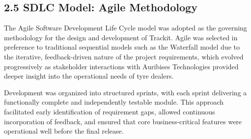 \documentclass[12pt, oneside]{article}
\begin{document}
\subsection*{2.5 SDLC Model: Agile Methodology}

The Agile Software Development Life Cycle model was adopted as the governing methodology for the design and development of Trackit. Agile was selected in preference to traditional sequential models such as the Waterfall model due to the iterative, feedback-driven nature of the project requirements, which evolved progressively as stakeholder interactions with Auribises Technologies provided deeper insight into the operational needs of tyre dealers.

\vspace{0.5em}
Development was organized into structured sprints, with each sprint delivering a functionally complete and independently testable module. This approach facilitated early identification of requirement gaps, allowed continuous incorporation of feedback, and ensured that core business-critical features were operational well before the final release.

\vspace{0.5em}
\end{document}
